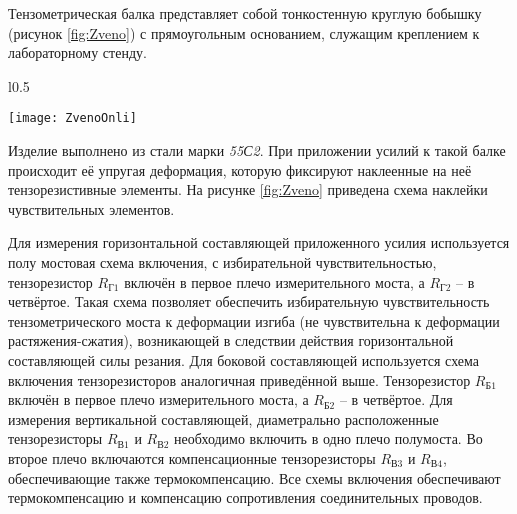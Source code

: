 	Тензометрическая балка представляет собой тонкостенную круглую бобышку (рисунок \ref{fig:Zveno}) с прямоугольным основанием, служащим креплением к лабораторному стенду. 


	\begin{wrapfigure}{l}{0.5\textwidth}
	  \vspace{-25pt}
	  \begin{center}
	    \texttt{[image: ZvenoOnli]}
	  \end{center}
	  \vspace{-15pt}
	  \caption{Схема наклейки тензорезисторов}
	  \label{fig:Zveno}
	  \vspace{-16pt}
	\end{wrapfigure}


	Изделие выполнено из стали марки \textit{55С2}. При приложении усилий к такой балке происходит её упругая деформация, которую фиксируют наклеенные на неё тензорезистивные элементы. На рисунке \ref{fig:Zveno} приведена схема наклейки чувствительных элементов.

	Для измерения горизонтальной составляющей приложенного усилия используется полу мостовая схема включения, с избирательной чувствительностью, тензорезистор $R_\textit{Г1}$ включён в первое плечо измерительного моста, а $R_\textit{Г2}$ – в четвёртое. Такая схема позволяет обеспечить избирательную чувствительность тензометрического моста к деформации изгиба (не чувствительна к деформации растяжения-сжатия), возникающей в следствии действия горизонтальной составляющей силы резания. Для боковой составляющей используется схема включения тензорезисторов аналогичная приведённой выше. Тензорезистор $R_\textit{Б1}$ включён в первое плечо измерительного моста, а $R_\textit{Б2}$ – в четвёртое. Для измерения вертикальной составляющей, диаметрально расположенные тензорезисторы $R_\textit{В1}$ и $R_\textit{В2}$ необходимо включить в одно плечо полумоста. Во второе плечо включаются компенсационные тензорезисторы $R_\textit{В3}$ и $R_\textit{В4}$, обеспечивающие также термокомпенсацию. Все схемы включения обеспечивают термокомпенсацию и компенсацию сопротивления соединительных проводов.

